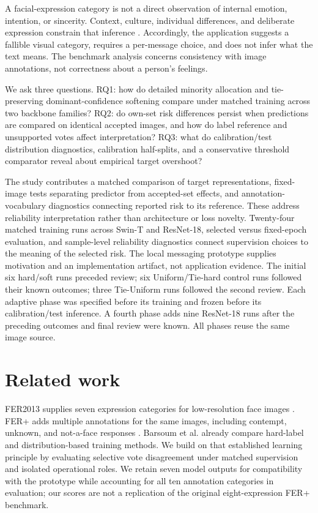\documentclass[pdflatex,sn-mathphys-num]{sn-jnl}
\begin{document}
A facial-expression category is not a direct observation of internal emotion, intention, or sincerity. Context, culture, individual differences, and deliberate expression constrain that inference \cite{barrett2019emotions}. Accordingly, the application suggests a fallible visual category, requires a per-message choice, and does not infer what the text means. The benchmark analysis concerns consistency with image annotations, not correctness about a person's feelings.

We ask three questions. RQ1: how do detailed minority allocation and tie-preserving dominant-confidence softening compare under matched training across two backbone families? RQ2: do own-set risk differences persist when predictions are compared on identical accepted images, and how do label reference and unsupported votes affect interpretation? RQ3: what do calibration/test distribution diagnostics, calibration half-splits, and a conservative threshold comparator reveal about empirical target overshoot?

The study contributes a matched comparison of target representations, fixed-image tests separating predictor from accepted-set effects, and annotation-vocabulary diagnostics connecting reported risk to its reference. These address reliability interpretation rather than architecture or loss novelty. Twenty-four matched training runs across Swin-T and ResNet-18, selected versus fixed-epoch evaluation, and sample-level reliability diagnostics connect supervision choices to the meaning of the selected risk. The local messaging prototype supplies motivation and an implementation artifact, not application evidence. The initial six hard/soft runs preceded review; six Uniform/Tie-hard control runs followed their known outcomes; three Tie-Uniform runs followed the second review. Each adaptive phase was specified before its training and frozen before its calibration/test inference. A fourth phase adds nine ResNet-18 runs after the preceding outcomes and final review were known. All phases reuse the same image source.

\section{Related work}
FER2013 supplies seven expression categories for low-resolution face images \cite{goodfellow2013fer}. FER+ adds multiple annotations for the same images, including contempt, unknown, and not-a-face responses \cite{barsoum2016ferplus}. Barsoum et al. already compare hard-label and distribution-based training methods. We build on that established learning principle by evaluating selective vote disagreement under matched supervision and isolated operational roles. We retain seven model outputs for compatibility with the prototype while accounting for all ten annotation categories in evaluation; our scores are not a replication of the original eight-expression FER+ benchmark.
\end{document}

